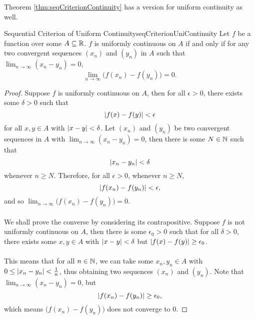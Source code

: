 \documentclass[math]{amznotes}
\theoremstyle{remark}
\begin{document}
Theorem \ref{thm:seqCriterionContinuity} has a version for uniform continuity as well.
\begin{thmbox}{Sequential Criterion of Uniform Continuity}{seqCriterionUniContinuity}
    Let $f$ be a function over some $A \subseteq \mathbb{R}$. $f$ is uniformly continuous on $A$ if and only if for any two convergent sequences $(x_n)$ and $(y_n)$ in $A$ such that $\lim_{n \to \infty}(x_n - y_n) = 0$, 
    \begin{equation*}
        \lim_{n \to \infty}\bigl(f(x_n) - f(y_n)\bigr) = 0.
    \end{equation*}
    \tcblower
    \begin{proof}
        Suppose $f$ is uniformly continuous on $A$, then for all $\epsilon > 0$, there exists some $\delta > 0$ such that
        \begin{equation*}
            {\left\lvert {f(x) - f(y)} \right\rvert} < \epsilon
        \end{equation*}
        for all $x, y \in A$ with ${\left\lvert {x - y} \right\rvert} < \delta$. Let $(x_n)$ and $(y_n)$ be two convergent sequences in $A$ with $\lim_{n \to \infty}(x_n - y_n) = 0$, then there is some $N \in \mathbb{N}$ such that 
        \begin{equation*}
            {\left\lvert {x_n - y_n} \right\rvert} < \delta
        \end{equation*}
        whenever $n \geq N$. Therefore, for all $\epsilon > 0$, whenever $n \geq N$, 
        \begin{equation*}
            {\left\lvert {f(x_n) - f(y_n)} \right\rvert} < \epsilon,
        \end{equation*}
        and so $\lim_{n \to \infty}\bigl(f(x_n) - f(y_n)\bigr) = 0$.
        \\\\
        We shall prove the converse by considering its contrapositive. Suppose $f$ is not uniformly continuous on $A$, then there is some $\epsilon_0 > 0$ such that for all $\delta > 0$, there exists some $x, y \in A$ with ${\left\lvert {x - y} \right\rvert} < \delta$ but ${\left\lvert {f(x) - f(y)} \right\rvert} \geq \epsilon_0$.
        \\\\
        This means that for all $n \in \mathbb{N}$, we can take some $x_n, y_n \in A$ with $0 \leq {\left\lvert {x_n - y_n} \right\rvert} < \frac{1}{n}$, thus obtaining two sequences $(x_n)$ and $(y_n)$. Note that $\lim_{n \to \infty}(x_n - y_n) = 0$, but 
        \begin{equation*}
            {\left\lvert {f(x_n) - f(y_n)} \right\rvert} \geq \epsilon_0,
        \end{equation*}
        which means $\bigl(f(x_n) - f(y_n)\bigr)$ does not converge to $0$.
    \end{proof}
\end{thmbox}
\end{document}
